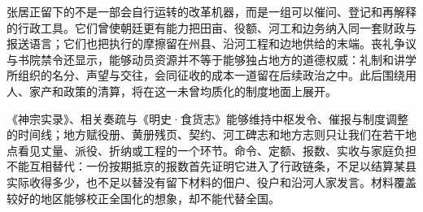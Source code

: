 张居正留下的不是一部会自行运转的改革机器，而是一组可以催问、登记和再解释的行政工具。它们曾使朝廷更有能力把田亩、役额、河工和边务纳入同一套财政与报送语言；它们也把执行的摩擦留在州县、沿河工程和边地供给的末端。丧礼争议与书院禁令还显示，能够动员资源并不等于能够独占地方的道德权威：礼制和讲学所组织的名分、声望与交往，会同征收的成本一道留在后续政治之中。此后围绕用人、家产和政策的清算，将在这一未曾均质化的制度地面上展开。

\begin{debate}
《神宗实录》、相关奏疏与《明史·食货志》能够维持中枢发令、催报与制度调整的时间线；地方赋役册、黄册残页、契约、河工碑志和地方志则只让我们在若干地点看见丈量、派役、折纳或工程的一个环节。命令、定额、报数、实收与家庭负担不能互相替代：一份按期抵京的报数首先证明它进入了行政链条，不足以结算某县实际收得多少，也不足以替没有留下材料的佃户、役户和沿河人家发言。材料覆盖较好的地区能够校正全国化的想象，却不能代替全国。
\end{debate}
